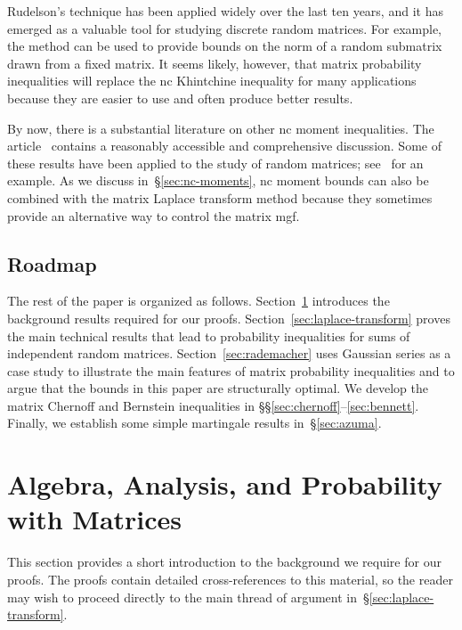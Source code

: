 \documentclass[11pt,letterpaper,twoside,reqno,draft]{amsart}
\theoremstyle{remark}
\numberwithin{equation}{section}
\numberwithin{thm}{section}
\begin{document}
Rudelson's technique has been applied widely over the last ten years, and it has emerged as a valuable tool for studying discrete random matrices.  For example, the method can be used to provide bounds on the norm of a random submatrix~\cite[Thm.~1.8]{RV07:Sampling-Large} drawn from a fixed matrix.  It seems likely, however, that matrix probability inequalities will replace the nc Khintchine inequality for many applications because they are easier to use and often produce better results.  

By now, there is a substantial literature on other nc moment inequalities.  The article~\cite{JX05:Best-Constants} contains a reasonably accessible and comprehensive discussion.  Some of these results have been applied to the study of random matrices; see~\cite{JX08:Noncommutative-Burkholder-II} for an example.  As we discuss in~\S\ref{sec:nc-moments}, nc moment bounds can also be combined with the matrix Laplace transform method because they sometimes provide an alternative way to control the matrix mgf.

\subsection{Roadmap}

The rest of the paper is organized as follows.
Section~\ref{sec:prelim} introduces the background results required for our proofs.
Section~\ref{sec:laplace-transform} proves the main technical results that lead to probability inequalities for sums of independent random matrices.  Section~\ref{sec:rademacher} uses Gaussian series as a case study to illustrate the main features of matrix probability inequalities and to argue that the bounds in this paper are structurally optimal.  We develop the matrix Chernoff and Bernstein inequalities in \S\S\ref{sec:chernoff}--\ref{sec:bennett}.  Finally, we establish some simple martingale results in~\S\ref{sec:azuma}.

\section{Algebra, Analysis, and Probability with Matrices} \label{sec:prelim}

This section provides a short introduction to the background we require for our proofs.  The proofs contain detailed cross-references to this material, so the reader may wish to proceed directly to the main thread of argument in~\S\ref{sec:laplace-transform}.

 
\end{document}
